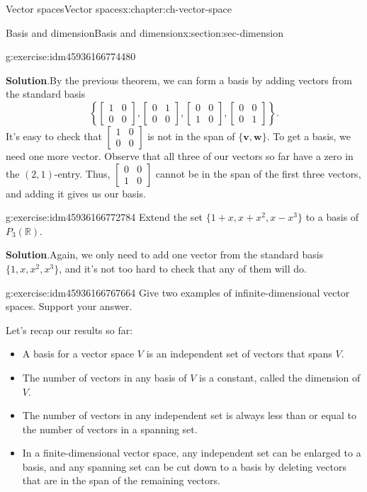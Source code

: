 \documentclass[oneside,10pt,]{book}
\newcommand{\blocktitlefont}{\relax}
\numberwithin{equation}{section}
\newcommand{\bbm}{\begin{bmatrix}}
\newcommand{\ebm}{\end{bmatrix}}
\newcommand{\R}{\mathbb{R}}
\newcommand{\vv}{\mathbf{v}}
\newcommand{\ww}{\mathbf{w}}
\newcommand{\amp}{&}
\begin{document}
\begin{chapterptx}{Vector spaces}{}{Vector spaces}{}{}{x:chapter:ch-vector-space}
\begin{sectionptx}{Basis and dimension}{}{Basis and dimension}{}{}{x:section:sec-dimension}
\begin{inlineexercise}{}{g:exercise:idm45936166774480}
%
\par\smallskip%
\noindent\textbf{\blocktitlefont Solution}.\label{g:solution:idm45936166773040}{}\hypertarget{g:solution:idm45936166773040}{}\quad{}By the previous theorem, we can form a basis by adding vectors from the standard basis%
\begin{equation*}
\left\{\bbm 1\amp 0\\0\amp 0\ebm, \bbm 0\amp 1\\0\amp 0\ebm, \bbm 0\amp 0\\1\amp 0\ebm, \bbm 0\amp 0\\0\amp 1\ebm\right\}\text{.}
\end{equation*}
It's easy to check that \(\bbm 1\amp 0\\0\amp 0\ebm\) is not in the span of \(\{\vv,\ww\}\). To get a basis, we need one more vector. Observe that all three of our vectors so far have a zero in the \((2,1)\)-entry. Thus, \(\bbm 0\amp 0\\1\amp 0\ebm\) cannot be in the span of the first three vectors, and adding it gives us our basis.%
\end{inlineexercise}%
\begin{inlineexercise}{}{g:exercise:idm45936166772784}%
Extend the set \(\{1+x,x+x^2,x-x^3\}\) to a basis of \(P_3(\R)\).%
\par\smallskip%
\noindent\textbf{\blocktitlefont Solution}.\label{g:solution:idm45936166768496}{}\hypertarget{g:solution:idm45936166768496}{}\quad{}Again, we only need to add one vector from the standard basis \(\{1,x,x^2,x^3\}\), and it's not too hard to check that any of them will do.%
\end{inlineexercise}%
\begin{inlineexercise}{}{g:exercise:idm45936166767664}%
Give two examples of infinite-dimensional vector spaces. Support your answer.%
\end{inlineexercise}%
Let's recap our results so far:%
\begin{itemize}[label=\textbullet]
\item{}A basis for a vector space \(V\) is an independent set of vectors that spans \(V\).%
\item{}The number of vectors in any basis of \(V\) is a constant, called the dimension of \(V\).%
\item{}The number of vectors in any independent set is always less than or equal to the number of vectors in a spanning set.%
\item{}In a finite-dimensional vector space, any independent set can be enlarged to a basis, and any spanning set can be cut down to a basis by deleting vectors that are in the span of the remaining vectors.%

\end{itemize}
\end{sectionptx}
\end{chapterptx}
\end{document}
